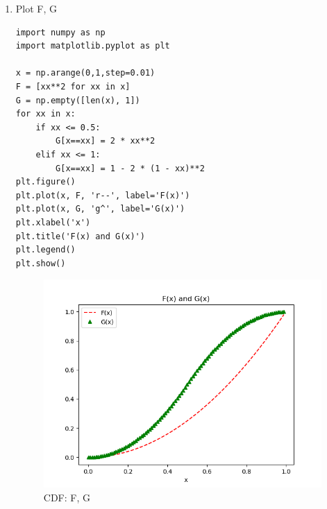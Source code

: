 \documentclass[preprint,12pt]{elsarticle}
\begin{document}
    \begin{enumerate}
        \item Plot F, G
        \begin{lstlisting}
import numpy as np
import matplotlib.pyplot as plt

x = np.arange(0,1,step=0.01)
F = [xx**2 for xx in x]
G = np.empty([len(x), 1])
for xx in x:
    if xx <= 0.5:
        G[x==xx] = 2 * xx**2
    elif xx <= 1:
        G[x==xx] = 1 - 2 * (1 - xx)**2
plt.figure()
plt.plot(x, F, 'r--', label='F(x)')
plt.plot(x, G, 'g^', label='G(x)')
plt.xlabel('x')
plt.title('F(x) and G(x)')
plt.legend()
plt.show()
        \end{lstlisting}
        \begin{figure}[htbp!]
            \center
            \includegraphics[width = \textwidth]{1.png}
            \caption{CDF: F, G}
            \label{fig:1}
        \end{figure}
    

\end{enumerate}
\end{document}
